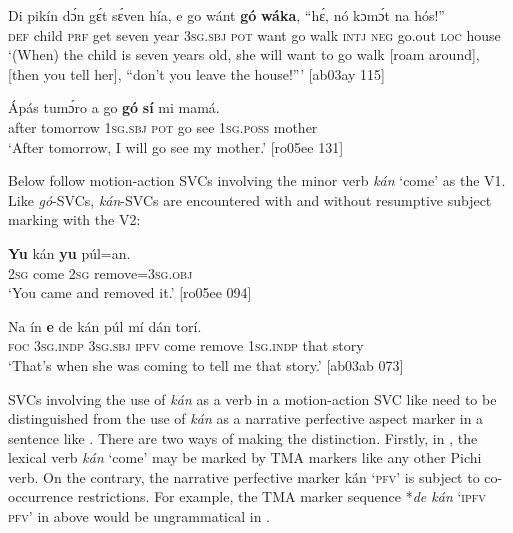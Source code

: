 \ea%
    \label{ex:key:1550}
    \gll Di  pikín  dɔ́n  gɛ́t  sɛ́ven  hía,    e    go  wánt  \textbf{gó}  \textbf{wáka},
“hɛ́,  nó  kɔmɔ́t  na  hós!”\\
\textsc{def}  child  \textsc{prf}  get  seven  year    \textsc{3sg.sbj}  \textsc{pot}  want  go  walk
\textsc{intj}  \textsc{neg}  go.out  \textsc{loc}  house\\
\glt ‘(When) the child is seven years old, she will want to go walk [roam around], 
[then you tell her], “don’t you leave the house!”’ [ab03ay 115]
\z


\ea%
    \label{ex:key:1551}
    \gll \'{A}pás  tumɔ́ro    a    go  \textbf{gó}  \textbf{sí}  mi    mamá.\\
after  tomorrow  \textsc{1sg.sbj}  \textsc{pot}  go  see  \textsc{1sg.poss}  mother\\

\glt ‘After tomorrow, I will go see my mother.’ [ro05ee 131]
\z

Below follow motion-action SVCs involving the minor verb \textit{kán} ‘come’ as the V1. Like \textit{gó}{}-SVCs, \textit{kán}{}-SVCs are encountered with  and without  resumptive subject marking with the V2:


\ea%
    \label{ex:key:1552}
    \gll \textbf{Yu}  kán    \textbf{yu}  púl=an.\\
\textsc{2sg}  come  \textsc{2sg}  remove=\textsc{3sg.obj}\\

\glt ‘You came and removed it.’ [ro05ee 094]
\z


\ea%
    \label{ex:key:1553}
    \gll Na  ín    \textbf{e}    de  kán    púl    mí    dán  torí.\\
\textsc{foc}  \textsc{3sg.indp}  \textsc{3sg.sbj}  \textsc{ipfv}  come  remove  \textsc{1sg.indp}  that  story\\

\glt ‘That’s when she was coming to tell me that story.’ [ab03ab 073]
\z

SVCs involving the use of \textit{kán} as a verb in a motion-action SVC like  need to be distinguished from the use of \textit{kán} as a narrative perfective aspect marker in a sentence like . There are two ways of making the distinction. Firstly, in , the lexical verb \textit{kán} ‘come’ may be marked by TMA markers like any other Pichi verb. On the contrary, the narrative perfective marker kán ‘\textsc{pfv}’ is subject to co-occurrence restrictions. For example, the TMA marker sequence *\textit{de kán} ‘\textsc{ipfv} \textsc{pfv}’ in  above would be ungrammatical in .


